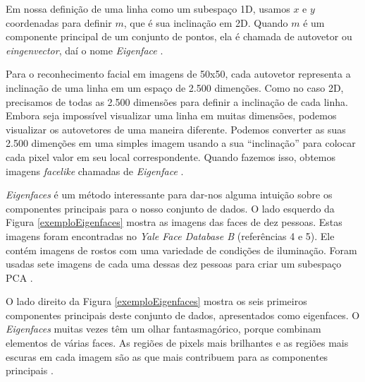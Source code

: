 Em nossa definição de uma linha como um subespaço 1D, usamos $\displaystyle x$ e $\displaystyle y$ coordenadas para definir $\displaystyle m$, que é sua inclinação em 2D. Quando $\displaystyle m$ é um componente principal de um conjunto de pontos, ela é chamada de autovetor ou \textit{eingenvector}, daí o nome \textit{Eigenface} \cite{hewitt}. 

Para o reconhecimento facial em imagens de 50x50, cada autovetor representa a inclinação de uma linha em um espaço de 2.500 dimenções. Como no caso 2D, precisamos de todas as 2.500 dimensões para definir a inclinação de cada linha. Embora seja impossível visualizar uma linha em muitas dimensões, podemos visualizar os autovetores de uma maneira diferente. Podemos converter as suas 2.500 dimenções em uma simples imagem usando a sua ``inclinação'' para colocar cada pixel valor em seu local correspondente. Quando fazemos isso, obtemos imagens \textit{facelike} chamadas de \textit{Eigenface} \cite{hewitt}.

\textit{Eigenfaces} é um método interessante para dar-nos alguma intuição sobre os componentes principais para o nosso conjunto de dados. O lado esquerdo da Figura \ref{exemploEigenfaces} mostra as imagens das faces de dez pessoas. Estas imagens foram encontradas no \textit{Yale Face Database B} (referências 4 e 5). Ele contém imagens de rostos com uma variedade de condições de iluminação. Foram usadas sete imagens de cada uma dessas dez pessoas para criar um subespaço PCA \cite{hewitt}. 

O lado direito da Figura \ref{exemploEigenfaces} mostra os seis primeiros componentes principais deste conjunto de dados, apresentados como eigenfaces. O \textit{Eigenfaces} muitas vezes têm um olhar fantasmagórico, porque combinam elementos de várias faces. As regiões de pixels mais brilhantes e as regiões mais escuras em cada imagem são as que mais contribuem para as componentes principais \cite{hewitt}. 

